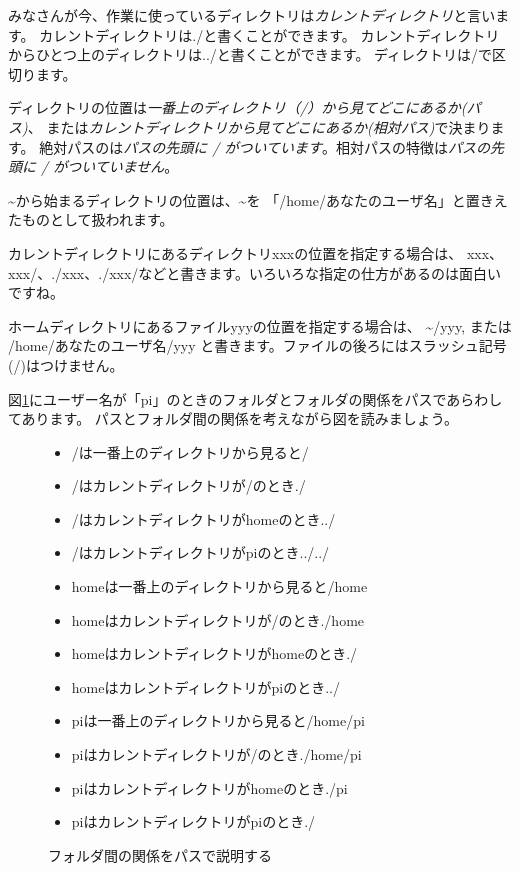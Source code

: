 みなさんが今、作業に使っているディレクトリは\emph{カレントディレクトリ}と言います。
カレントディレクトリは./と書くことができます。
カレントディレクトリからひとつ上のディレクトリは../と書くことができます。
ディレクトリは/で区切ります。

ディレクトリの位置は\emph{一番上のディレクトリ（/）から見てどこにあるか(パス)}、
または\emph{カレントディレクトリから見てどこにあるか(相対パス)}で決まります。
絶対パスのは\emph{パスの先頭に / がついています}。相対パスの特徴は\emph{パスの先頭に / がついていません}。

\textasciitilde から始まるディレクトリの位置は、\textasciitilde を
「/home/あなたのユーザ名」と置きえたものとして扱われます。

カレントディレクトリにあるディレクトリxxxの位置を指定する場合は、
xxx、xxx/、./xxx、./xxx/などと書きます。いろいろな指定の仕方があるのは面白いですね。

ホームディレクトリにあるファイルyyyの位置を指定する場合は、
\textasciitilde /yyy, または /home/あなたのユーザ名/yyy と書きます。ファイルの後ろにはスラッシュ記号(/)はつけません。

図\ref{fig:folder-path}にユーザー名が「pi」のときのフォルダとフォルダの関係をパスであらわしてあります。
パスとフォルダ間の関係を考えながら図を読みましょう。

\begin{figure}[H]
    \begin{minipage}{0.4\hsize}
        
    \end{minipage}
    \begin{minipage}{0.6\hsize}
        \begin{itemize}
        \item /は一番上のディレクトリから見ると/
        \item /はカレントディレクトリが/のとき./
        \item /はカレントディレクトリがhomeのとき../
        \item /はカレントディレクトリがpiのとき../../
        \item homeは一番上のディレクトリから見ると/home
        \item homeはカレントディレクトリが/のとき./home
        \item homeはカレントディレクトリがhomeのとき./
        \item homeはカレントディレクトリがpiのとき../
        \item piは一番上のディレクトリから見ると/home/pi
        \item piはカレントディレクトリが/のとき./home/pi
        \item piはカレントディレクトリがhomeのとき./pi
        \item piはカレントディレクトリがpiのとき./
        \end{itemize}
    \end{minipage}
    \caption{フォルダ間の関係をパスで説明する}
    \label{fig:folder-path}
\end{figure}

